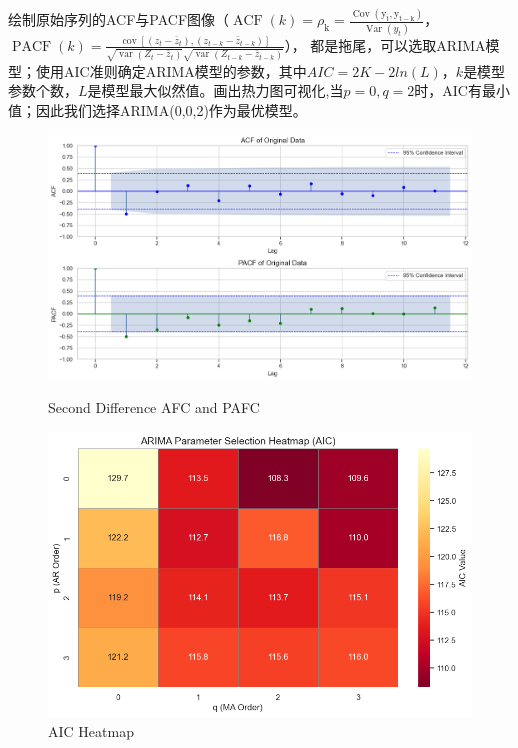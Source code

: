 \documentclass[UTF8]{ctexart}
\begin{document}
绘制原始序列的ACF与PACF图像（$
\operatorname{ACF}(k)=\rho_{\mathrm{k}}=\frac{\operatorname{Cov}\left(\mathrm{y}_{\mathrm{t}}, \mathrm{y}_{\mathrm{t}-\mathrm{k}}\right)}{\operatorname{Var}\left(y_t\right)}
$，$\operatorname{PACF}(k)=\frac{\operatorname{cov}\left[\left(z_t-\bar{z}_t\right),\left(z_{t-k}-\bar{z}_{t-k}\right)\right]}{\sqrt{\operatorname{var}\left(Z_t-\bar{z}_t\right)} \sqrt{\operatorname{var}\left(Z_{t-k}-\bar{z}_{t-k}\right)}}$），
都是拖尾，可以选取ARIMA模型；使用AIC准则确定ARIMA模型的参数，其中$AIC=2K-2ln(L)$，$k$是模型参数个数，$L$是模型最大似然值。画出热力图可视化,当$p=0,q=2$时，AIC有最小值；因此我们选择ARIMA(0,0,2)作为最优模型。
\begin{figure}[ht]
  \centering
  \begin{minipage}[b]{0.42\textwidth} %
    \includegraphics[width=\textwidth]{3} %
    \caption{Second Difference AFC and PAFC}
    \label{fig:image-a}
  \end{minipage}
  \hfill %
  \begin{minipage}[b]{0.42\textwidth} %
    \includegraphics[width=\textwidth]{4} %
    \caption{AIC Heatmap}
    \label{fig:image-b}
  \end{minipage}
  \label{fig:images}
\end{figure}
\end{document}
